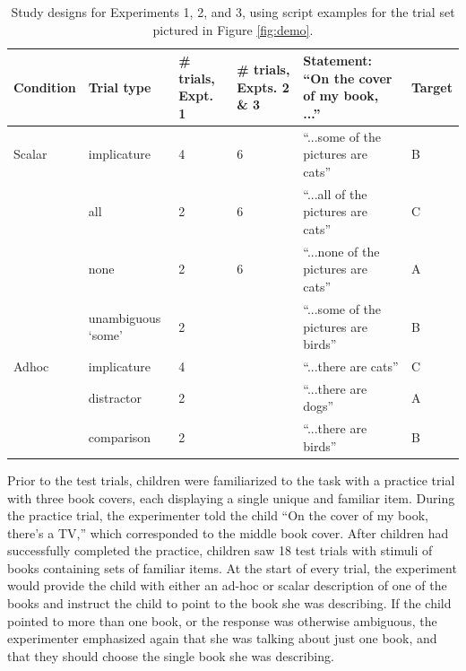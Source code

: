 \documentclass[man]{apa2}
\begin{document}
 \begin{table}
 \footnotesize
 \centering 
     \begin{tabular}{C{1.5cm} C{2cm} C{1.5cm} C{1.5cm} C{4.5cm} C{1.5cm}} 
                      \hline 
       \null   Condition  & Trial type & \# trials, Expt. 1 & \# trials, Expts. 2 \& 3 & Statement: ``On the cover of my book, ...'' & Target   \\ 
       \hline  
            Scalar & implicature & 4 & 6 &  ``...some of the pictures are cats'' & B	 \\ 
          & all  & 2 &  6 & ``...all of the pictures are cats'' & C		                 \\
           & none  & 2 & 6 & ``...none of the pictures are cats'' & A			\\ 
               & unambiguous `some' 	&  2 &  & ``...some of the pictures are birds'' & B					        \\ 
	\hline
	    Adhoc       & implicature & 4 &  & ``...there are cats'' & C 		\\ 
	     & distractor & 2 &  & ``...there are dogs'' & A	     \\ 
          & comparison & 2 &  & ``...there are birds'' & B 	   \\
       \hline 
     \end{tabular} 
     \caption{Study designs for Experiments 1, 2, and 3, using script examples for the trial set pictured in Figure \ref{fig:demo}.  \label{tab:scripts} }
 \end{table}
 

Prior to the test trials, children were familiarized to the task with a practice trial with three book covers, each displaying a single unique and familiar item.  During the practice trial, the experimenter told the child ``On the cover of my book, there's a TV,'' which corresponded to the middle book cover. After children had successfully completed the practice, children saw 18 test trials with stimuli of books containing sets of familiar items. At the start of every trial, the experiment would provide the child with either an ad-hoc or scalar description of one of the books and instruct the child to point to the book she was describing. If the child pointed to more than one book, or the response was otherwise ambiguous, the experimenter emphasized again that she was talking about just one book, and that they should choose the single book she was describing. 
\end{document}
